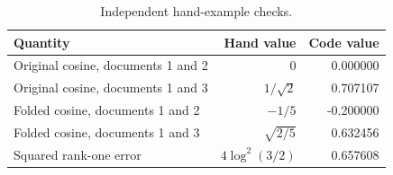 \par
\begin{table}[htbp]\centering
\small
\caption{Independent hand-example checks.}
\begin{tabular}{lrr}\toprule
Quantity & Hand value & Code value \\ \midrule
Original cosine, documents 1 and 2 & $0$ & 0.000000 \\
Original cosine, documents 1 and 3 & $1/\sqrt2$ & 0.707107 \\
Folded cosine, documents 1 and 2 & $-1/5$ & -0.200000 \\
Folded cosine, documents 1 and 3 & $\sqrt{2/5}$ & 0.632456 \\
Squared rank-one error & $4\log^2(3/2)$ & 0.657608 \\
\bottomrule\end{tabular}
\end{table}
\par

